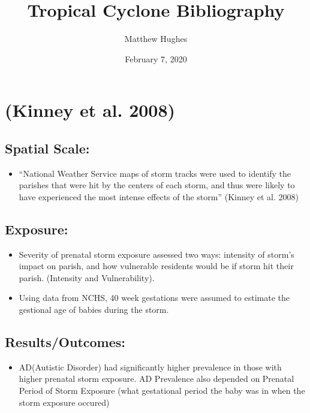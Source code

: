 \documentclass[
]{article}
\title{Tropical Cyclone Bibliography}
\author{Matthew Hughes}
\date{February 7, 2020}
\providecommand{\tightlist}{%
  \setlength{\itemsep}{0pt}\setlength{\parskip}{0pt}}
\begin{document}
\maketitle

\hypertarget{kinney2008autism}{%
\section{(Kinney et al. 2008)}\label{kinney2008autism}}

\hypertarget{spatial-scale}{%
\subsection{Spatial Scale:}\label{spatial-scale}}

\begin{itemize}
\tightlist
\item
  ``National Weather Service maps of storm tracks were used to identify
  the parishes that were hit by the centers of each storm, and thus were
  likely to have experienced the most intense effects of the storm''
  (Kinney et al. 2008)
\end{itemize}

\hypertarget{exposure}{%
\subsection{Exposure:}\label{exposure}}

\begin{itemize}
\tightlist
\item
  Severity of prenatal storm exposure assessed two ways: intensity of
  storm's impact on parish, and how vulnerable residents would be if
  storm hit their parish. (Intensity and Vulnerability).
\item
  Using data from NCHS, 40 week gestations were assumed to estimate the
  gestional age of babies during the storm.
\end{itemize}

\hypertarget{resultsoutcomes}{%
\subsection{Results/Outcomes:}\label{resultsoutcomes}}

\begin{itemize}
\tightlist
\item
  AD(Autistic Disorder) had significantly higher prevalence in those
  with higher prenatal storm exposure. AD Prevalence also depended on
  Prenatal Period of Storm Exposure (what gestational period the baby
  was in when the storm exposure occured)
\end{itemize}
\end{document}
